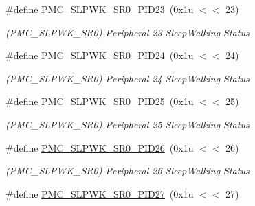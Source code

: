 \begin{DoxyCompactItemize}
\mbox{\label{group__SAMS70__PMC_ga81ac1e46ee8c5b920e9b400ef630c459}} 
\#define \mbox{\hyperlink{group__SAMS70__PMC_ga81ac1e46ee8c5b920e9b400ef630c459}{P\+M\+C\+\_\+\+S\+L\+P\+W\+K\+\_\+\+S\+R0\+\_\+\+P\+I\+D23}}~(0x1u $<$$<$ 23)
\begin{DoxyCompactList}\small\item\em (P\+M\+C\+\_\+\+S\+L\+P\+W\+K\+\_\+\+S\+R0) Peripheral 23 Sleep\+Walking Status \end{DoxyCompactList}\item 
\mbox{\label{group__SAMS70__PMC_ga9489805fde5c17ca52b5cecbe55b2b8b}} 
\#define \mbox{\hyperlink{group__SAMS70__PMC_ga9489805fde5c17ca52b5cecbe55b2b8b}{P\+M\+C\+\_\+\+S\+L\+P\+W\+K\+\_\+\+S\+R0\+\_\+\+P\+I\+D24}}~(0x1u $<$$<$ 24)
\begin{DoxyCompactList}\small\item\em (P\+M\+C\+\_\+\+S\+L\+P\+W\+K\+\_\+\+S\+R0) Peripheral 24 Sleep\+Walking Status \end{DoxyCompactList}\item 
\mbox{\label{group__SAMS70__PMC_ga7e24a1f1f3d0136da4d8c6b22c6e3383}} 
\#define \mbox{\hyperlink{group__SAMS70__PMC_ga7e24a1f1f3d0136da4d8c6b22c6e3383}{P\+M\+C\+\_\+\+S\+L\+P\+W\+K\+\_\+\+S\+R0\+\_\+\+P\+I\+D25}}~(0x1u $<$$<$ 25)
\begin{DoxyCompactList}\small\item\em (P\+M\+C\+\_\+\+S\+L\+P\+W\+K\+\_\+\+S\+R0) Peripheral 25 Sleep\+Walking Status \end{DoxyCompactList}\item 
\mbox{\label{group__SAMS70__PMC_ga7a175554db3d8af248c9e9b39b12d96b}} 
\#define \mbox{\hyperlink{group__SAMS70__PMC_ga7a175554db3d8af248c9e9b39b12d96b}{P\+M\+C\+\_\+\+S\+L\+P\+W\+K\+\_\+\+S\+R0\+\_\+\+P\+I\+D26}}~(0x1u $<$$<$ 26)
\begin{DoxyCompactList}\small\item\em (P\+M\+C\+\_\+\+S\+L\+P\+W\+K\+\_\+\+S\+R0) Peripheral 26 Sleep\+Walking Status \end{DoxyCompactList}\item 
\mbox{\label{group__SAMS70__PMC_ga9f64b43b4a4f49e0a4a4f4f4d6fa86ee}} 
\#define \mbox{\hyperlink{group__SAMS70__PMC_ga9f64b43b4a4f49e0a4a4f4f4d6fa86ee}{P\+M\+C\+\_\+\+S\+L\+P\+W\+K\+\_\+\+S\+R0\+\_\+\+P\+I\+D27}}~(0x1u $<$$<$ 27)
$$
\end{DoxyCompactItemize}
